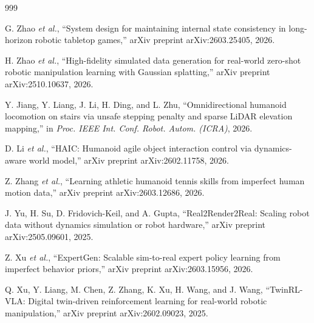 \documentclass[12pt,a4paper,oneside]{report}
\begin{document}
\begin{thebibliography}{999}

G. Zhao \textit{et al.}, ``System design for maintaining internal state consistency in long-horizon robotic tabletop games,'' arXiv preprint arXiv:2603.25405, 2026.




H. Zhao \textit{et al.}, ``High-fidelity simulated data generation for real-world zero-shot robotic manipulation learning with Gaussian splatting,'' arXiv preprint arXiv:2510.10637, 2026.




Y. Jiang, Y. Liang, J. Li, H. Ding, and L. Zhu, ``Omnidirectional humanoid locomotion on stairs via unsafe stepping penalty and sparse LiDAR elevation mapping,'' in \textit{Proc. IEEE Int. Conf. Robot. Autom. (ICRA)}, 2026.




D. Li \textit{et al.}, ``{HAIC}: Humanoid agile object interaction control via dynamics-aware world model,'' arXiv preprint arXiv:2602.11758, 2026.




Z. Zhang \textit{et al.}, ``Learning athletic humanoid tennis skills from imperfect human motion data,'' arXiv preprint arXiv:2603.12686, 2026.




J. Yu, H. Su, D. Fridovich-Keil, and A. Gupta, ``{Real2Render2Real}: Scaling robot data without dynamics simulation or robot hardware,'' arXiv preprint arXiv:2505.09601, 2025.




Z. Xu \textit{et al.}, ``{ExpertGen}: Scalable sim-to-real expert policy learning from imperfect behavior priors,'' arXiv preprint arXiv:2603.15956, 2026.




Q. Xu, Y. Liang, M. Chen, Z. Zhang, K. Xu, H. Wang, and J. Wang, ``{TwinRL-VLA}: Digital twin-driven reinforcement learning for real-world robotic manipulation,'' arXiv preprint arXiv:2602.09023, 2025.




\end{thebibliography}
\end{document}
